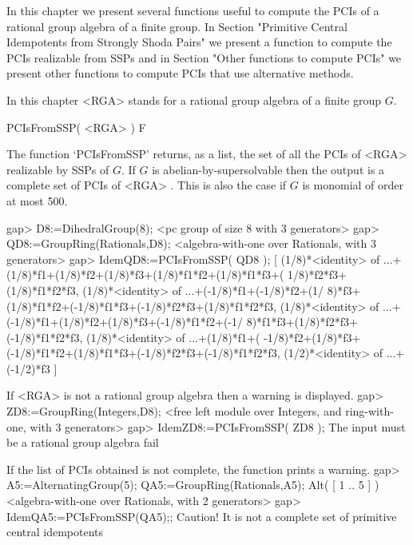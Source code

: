 
In this chapter we present several functions useful to compute the PCIs of a rational group 
algebra of a finite group. In Section "Primitive Central Idempotents from Strongly Shoda 
Pairs" we present a function to compute the PCIs realizable from SSPs and in Section "Other 
functions to compute PCIs" we present other functions to compute PCIs that use alternative 
methods. 

In this chapter <RGA> stands for a rational group algebra of a finite group $G$. 

 

\>PCIsFromSSP( <RGA>  ) F

The function `PCIsFromSSP' returns, as a list, the set of all the PCIs of 
<RGA> realizable by SSPs of $G$. If $G$ is abelian-by-supersolvable then 
the output is a complete set of PCIs of <RGA> \cite{ORS}. 
This is also the case if $G$ is monomial of order at most 500. 

\beginexample
    gap> D8:=DihedralGroup(8);
    <pc group of size 8 with 3 generators>
    gap> QD8:=GroupRing(Rationals,D8);
    <algebra-with-one over Rationals, with 3 generators>
    gap> IdemQD8:=PCIsFromSSP( QD8 );
    [ (1/8)*<identity> of ...+(1/8)*f1+(1/8)*f2+(1/8)*f3+(1/8)*f1*f2+(1/8)*f1*f3+(
        1/8)*f2*f3+(1/8)*f1*f2*f3, (1/8)*<identity> of ...+(-1/8)*f1+(-1/8)*f2+(1/
        8)*f3+(1/8)*f1*f2+(-1/8)*f1*f3+(-1/8)*f2*f3+(1/8)*f1*f2*f3,
      (1/8)*<identity> of ...+(-1/8)*f1+(1/8)*f2+(1/8)*f3+(-1/8)*f1*f2+(-1/
        8)*f1*f3+(1/8)*f2*f3+(-1/8)*f1*f2*f3, (1/8)*<identity> of ...+(1/8)*f1+(
        -1/8)*f2+(1/8)*f3+(-1/8)*f1*f2+(1/8)*f1*f3+(-1/8)*f2*f3+(-1/8)*f1*f2*f3,
      (1/2)*<identity> of ...+(-1/2)*f3 ]
\endexample

If <RGA> is not a rational group algebra then a warning is displayed.
\beginexample
    gap> ZD8:=GroupRing(Integers,D8);
    <free left module over Integers, and ring-with-one, with 3 generators>
    gap> IdemZD8:=PCIsFromSSP( ZD8 );
    The input must be a rational group algebra
    fail
\endexample
    

If the list of PCIs obtained is not complete, the function prints a warning.
\beginexample
    gap> A5:=AlternatingGroup(5); QA5:=GroupRing(Rationals,A5);
    Alt( [ 1 .. 5 ] )
    <algebra-with-one over Rationals, with 2 generators>
    gap> IdemQA5:=PCIsFromSSP(QA5);;
    Caution! It is not a complete set of primitive central idempotents
\endexample


